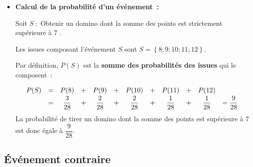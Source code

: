 \begin{ex}
\begin{itemize}
		      On résume la loi de probabilité dans le tableau suivant~:

		      \begin{center}
			      \begin{tabular}{|c|c|c|c|c|c|c|c|c|c|c|c|c|c|}
				      \hline
				      \cellcolor{gray!30}  $e_i$                         & $0$             & $1$             & $2$             & $3$             & $4$             & $5$             & $6$             & $7$             & $8$             & $9$             & $10$            & $11$            & $12$            \\ \hline
				      \cellcolor{gray!30} \rule[-4mm]{0mm}{10mm}$P(e_i)$ & $\dfrac{1}{28}$ & $\dfrac{1}{28}$ & $\dfrac{2}{28}$ & $\dfrac{2}{28}$ & $\dfrac{3}{28}$ & $\dfrac{3}{28}$ & $\dfrac{4}{28}$ & $\dfrac{3}{28}$ & $\dfrac{3}{28}$ & $\dfrac{2}{28}$ & $\dfrac{2}{28}$ & $\dfrac{1}{28}$ & $\dfrac{1}{28}$ \\ \hline
			      \end{tabular}
		      \end{center}

		      \ms

		\item \textbf{Calcul de la probabilité d'un événement~:}

		      Soit $S~:$ \og Obtenir un domino dont la somme des points est strictement supérieure à $7$ \fg{}.

		      Les issues composant l'événement $S$ sont $S = \left\{ 8 ; 9 ; 10 ; 11 ; 12 \right\}$.

		      Par définition, $P(S)$ est la \textbf{somme des probabilités des issues} qui le composent~:
		      \[
			      \def\arraystretch{1.5}
			      \begin{array}{rccccccccccl}
				      P(S) & = & P(8)          & + & P(9)          & + & P(10)         & + & P(11)         & + & P(12)         &                 \\
				           & = & \dfrac{3}{28} & + & \dfrac{2}{28} & + & \dfrac{2}{28} & + & \dfrac{1}{28} & + & \dfrac{1}{28} & = \dfrac{9}{28}
			      \end{array}
		      \]
		      La probabilité de tirer un domino dont la somme des points est supérieure à $7$ est donc égale à $\dfrac{9}{28}$.
	\end{itemize}
\end{ex}
\subsection{Événement contraire}

